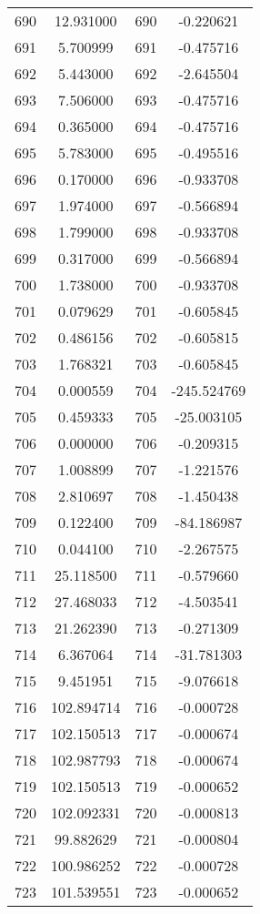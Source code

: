 \documentclass[12pt]{article}
\begin{document}
\begin{longtable}{@{}cccc@{}}
690 & 12.931000 & 690 & -0.220621 \\
691 & 5.700999 & 691 & -0.475716 \\
692 & 5.443000 & 692 & -2.645504 \\
693 & 7.506000 & 693 & -0.475716 \\
694 & 0.365000 & 694 & -0.475716 \\
695 & 5.783000 & 695 & -0.495516 \\
696 & 0.170000 & 696 & -0.933708 \\
697 & 1.974000 & 697 & -0.566894 \\
698 & 1.799000 & 698 & -0.933708 \\
699 & 0.317000 & 699 & -0.566894 \\
700 & 1.738000 & 700 & -0.933708 \\
701 & 0.079629 & 701 & -0.605845 \\
702 & 0.486156 & 702 & -0.605815 \\
703 & 1.768321 & 703 & -0.605845 \\
704 & 0.000559 & 704 & -245.524769 \\
705 & 0.459333 & 705 & -25.003105 \\
706 & 0.000000 & 706 & -0.209315 \\
707 & 1.008899 & 707 & -1.221576 \\
708 & 2.810697 & 708 & -1.450438 \\
709 & 0.122400 & 709 & -84.186987 \\
710 & 0.044100 & 710 & -2.267575 \\
711 & 25.118500 & 711 & -0.579660 \\
712 & 27.468033 & 712 & -4.503541 \\
713 & 21.262390 & 713 & -0.271309 \\
714 & 6.367064 & 714 & -31.781303 \\
715 & 9.451951 & 715 & -9.076618 \\
716 & 102.894714 & 716 & -0.000728 \\
717 & 102.150513 & 717 & -0.000674 \\
718 & 102.987793 & 718 & -0.000674 \\
719 & 102.150513 & 719 & -0.000652 \\
720 & 102.092331 & 720 & -0.000813 \\
721 & 99.882629 & 721 & -0.000804 \\
722 & 100.986252 & 722 & -0.000728 \\
723 & 101.539551 & 723 & -0.000652 \\

\end{longtable}
\end{document}
